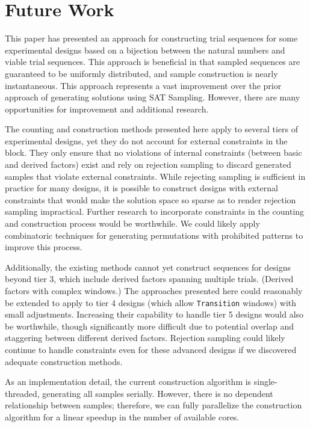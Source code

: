 
\chapter{Future Work}

This paper has presented an approach for constructing trial sequences for some experimental designs based on a bijection between the natural numbers and viable trial sequences. This approach is beneficial in that sampled sequences are guaranteed to be uniformly distributed, and sample construction is nearly instantaneous. This approach represents a vast improvement over the prior approach of generating solutions using SAT Sampling. However, there are many opportunities for improvement and additional research.

The counting and construction methods presented here apply to several tiers of experimental designs, yet they do not account for external constraints in the block. They only ensure that no violations of internal constraints (between basic and derived factors) exist and rely on rejection sampling to discard generated samples that violate external constraints. While rejecting sampling is sufficient in practice for many designs, it is possible to construct designs with external constraints that would make the solution space so sparse as to render rejection sampling impractical. Further research to incorporate constraints in the counting and construction process would be worthwhile. We could likely apply combinatoric techniques for generating permutations with prohibited patterns to improve this process.

Additionally, the existing methods cannot yet construct sequences for designs beyond tier 3, which include derived factors spanning multiple trials. (Derived factors with complex windows.) The approaches presented here could reasonably be extended to apply to tier 4 designs (which allow \texttt{Transition} windows) with small adjustments. Increasing their capability to handle tier 5 designs would also be worthwhile, though significantly more difficult due to potential overlap and staggering between different derived factors. Rejection sampling could likely continue to handle constraints even for these advanced designs if we discovered adequate construction methods.

As an implementation detail, the current construction algorithm is single-threaded, generating all samples serially. However, there is no dependent relationship between samples; therefore, we can fully parallelize the construction algorithm for a linear speedup in the number of available cores.

